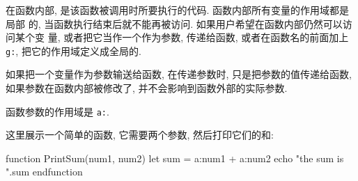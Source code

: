 在函数内部, 是该函数被调用时所要执行的代码. 函数内部所有变量的作用域都是局部
的, 当函数执行结束后就不能再被访问. 如果用户希望在函数内部仍然可以访问某个变
量, 或者把它当作一个作为参数, 传递给函数, 或者在函数名的前面加上 \texttt{g:},
把它的作用域定义成全局的.
\begin{warning}
    如果把一个变量作为参数输送给函数, 在传递参数时, 只是把参数的值传递给函数,
    如果参数在函数内部被修改了, 并不会影响到函数外部的实际参数.
\end{warning}

函数参数的作用域是 \texttt{a:}.

这里展示一个简单的函数, 它需要两个参数, 然后打印它们的和:
\begin{vimcode}
function PrintSum(num1, num2)
    let sum = a:num1 + a:num2
    echo "the sum is ".sum
endfunction
\end{vimcode}

